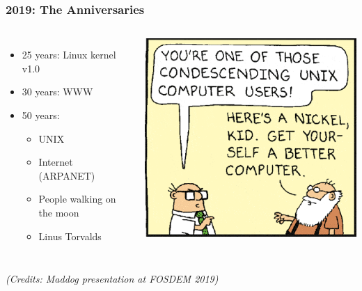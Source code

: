 \begin{frame}
  \frametitle{2019: The Anniversaries}
  \begin{columns}
  \begin{itemize}
    \item 25 years: Linux kernel v1.0
    \item 30 years: WWW
    \item 50 years:
    \begin{itemize}
      \item UNIX
      \item Internet (ARPANET)
      \item People walking on the moon
      \item Linus Torvalds
    \end{itemize}
  \end{itemize}
      \pause
      \includegraphics[scale=0.5]{images/nickel.png}
  \end{columns}

  \textit{(Credits: Maddog presentation at FOSDEM 2019)}
\end{frame}

